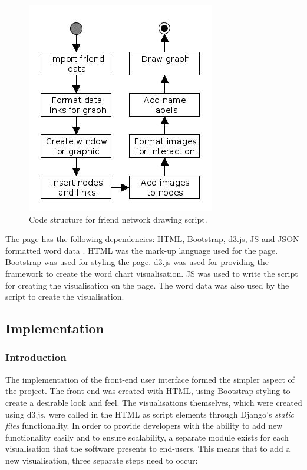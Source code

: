 \documentclass[12pt,onecolumn]{article}
\begin{document}
		\begin{figure}[h]
			\centering
			\includegraphics[scale=1]{network}
			\caption{Code structure for friend network drawing script.} \label{fig:networkdiagram}
		\end{figure}
		
	The page has the following dependencies: HTML, Bootstrap, d3.js, JS and JSON formatted word data \cite{Bootstrap, D3, JSON}. HTML was the mark-up language used for the page. Bootstrap was used for styling the page. d3.js was used for providing the framework to create the word chart visualisation. JS was used to write the script for creating the visualisation on the page. The word data was also used by the script to create the visualisation.
	
	\subsection{Implementation} %
	
	\subsubsection{Introduction}
	The implementation of the front-end user interface formed the simpler aspect of the project. The front-end was created with HTML, using Bootstrap styling to create a desirable look and feel. The visualisations themselves, which were created using d3.js, were called in the HTML as script elements through Django's \textit{static files} functionality. 
	In order to provide developers with the ability to add new functionality easily and to ensure scalability, a separate module exists for each visualisation that the software presents to end-users. This means that to add a new visualisation, three separate steps need to occur:
	
\end{document}
